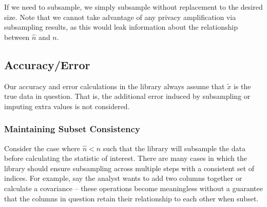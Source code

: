 \documentclass[11pt]{scrartcl} %
\begin{document}
If we need to subsample, we simply subsample without replacement to the desired size.
Note that we cannot take advantage of any privacy amplification via subsampling results,
as this would leak information about the relationship between $\hat{n}$ and $n$.


\subsection{Accuracy/Error}
Our accuracy and error calculations in the library always assume that $\tilde{x}$ is the true data in question.
That is, the additional error induced by subsampling or imputing extra values is not considered.

\subsubsection{Maintaining Subset Consistency}
Consider the case where $\hat{n} < n$ such that the library will subsample the data
before calculating the statistic of interest. There are many cases in which
the library should ensure subsampling across multiple steps with a consistent set of indices.
For example, say the analyst wants to add two columns together or calculate a covariance --
these operations become meaningless without a guarantee that the columns in question retain
their relationship to each other when subset. \newline


% 
% 
\end{document}
